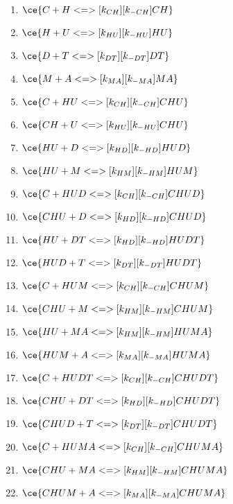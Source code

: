 \begin{enumerate}
\item $\ce{C + H <=>[k_{CH}][k_{-CH}] CH}$ %
\item $\ce{H + U <=>[k_{HU}][k_{-HU}] HU}$ %
\item $\ce{D + T <=>[k_{DT}][k_{-DT}] DT}$ %
\item $\ce{M + A <=>[k_{MA}][k_{-MA}] MA}$ %

\item $\ce{C + HU <=>[k_{CH}][k_{-CH}] CHU}$ %
\item $\ce{CH + U <=>[k_{HU}][k_{-HU}] CHU}$ %
\item $\ce{HU + D <=>[k_{HD}][k_{-HD}] HUD}$ %
\item $\ce{HU + M <=>[k_{HM}][k_{-HM}] HUM}$ %

\item $\ce{C + HUD <=>[k_{CH}][k_{-CH}] CHUD}$ %
\item $\ce{CHU + D <=>[k_{HD}][k_{-HD}] CHUD}$ %
\item $\ce{HU + DT <=>[k_{HD}][k_{-HD}] HUDT}$ %
\item $\ce{HUD + T <=>[k_{DT}][k_{-DT}] HUDT}$ %
\item $\ce{C + HUM <=>[k_{CH}][k_{-CH}] CHUM}$ %
\item $\ce{CHU + M <=>[k_{HM}][k_{-HM}] CHUM}$ %
\item $\ce{HU + MA <=>[k_{HM}][k_{-HM}] HUMA}$ %
\item $\ce{HUM + A <=>[k_{MA}][k_{-MA}] HUMA}$ %

\item $\ce{C + HUDT <=>[k_{CH}][k_{-CH}] CHUDT}$ %
\item $\ce{CHU + DT <=>[k_{HD}][k_{-HD}] CHUDT}$ %
\item $\ce{CHUD + T <=>[k_{DT}][k_{-DT}] CHUDT}$ %
\item $\ce{C + HUMA <=>[k_{CH}][k_{-CH}] CHUMA}$ %
\item $\ce{CHU + MA <=>[k_{HM}][k_{-HM}] CHUMA}$ %
\item $\ce{CHUM + A <=>[k_{MA}][k_{-MA}] CHUMA}$ %
\end{enumerate}

